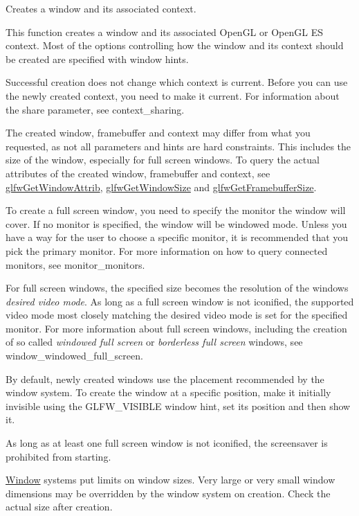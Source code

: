 Creates a window and its associated context. 

This function creates a window and its associated Open\+GL or Open\+GL ES context. Most of the options controlling how the window and its context should be created are specified with window hints.

Successful creation does not change which context is current. Before you can use the newly created context, you need to make it current. For information about the {\ttfamily share} parameter, see context\+\_\+sharing.

The created window, framebuffer and context may differ from what you requested, as not all parameters and hints are hard constraints. This includes the size of the window, especially for full screen windows. To query the actual attributes of the created window, framebuffer and context, see \hyperlink{group__window_ga1bb0c7e100418e284dbb800789c63d40}{glfw\+Get\+Window\+Attrib}, \hyperlink{group__window_ga7feb769ebb3f3d21579b5a3fb07be76e}{glfw\+Get\+Window\+Size} and \hyperlink{group__window_gaf7d17f3534b4b6dc9a6f905e3a240b7e}{glfw\+Get\+Framebuffer\+Size}.

To create a full screen window, you need to specify the monitor the window will cover. If no monitor is specified, the window will be windowed mode. Unless you have a way for the user to choose a specific monitor, it is recommended that you pick the primary monitor. For more information on how to query connected monitors, see monitor\+\_\+monitors.

For full screen windows, the specified size becomes the resolution of the window\textquotesingle{}s {\itshape desired video mode}. As long as a full screen window is not iconified, the supported video mode most closely matching the desired video mode is set for the specified monitor. For more information about full screen windows, including the creation of so called {\itshape windowed full screen} or {\itshape borderless full screen} windows, see window\+\_\+windowed\+\_\+full\+\_\+screen.

By default, newly created windows use the placement recommended by the window system. To create the window at a specific position, make it initially invisible using the G\+L\+F\+W\+\_\+\+V\+I\+S\+I\+B\+LE window hint, set its position and then show it.

As long as at least one full screen window is not iconified, the screensaver is prohibited from starting.

\hyperlink{class_window}{Window} systems put limits on window sizes. Very large or very small window dimensions may be overridden by the window system on creation. Check the actual size after creation.

